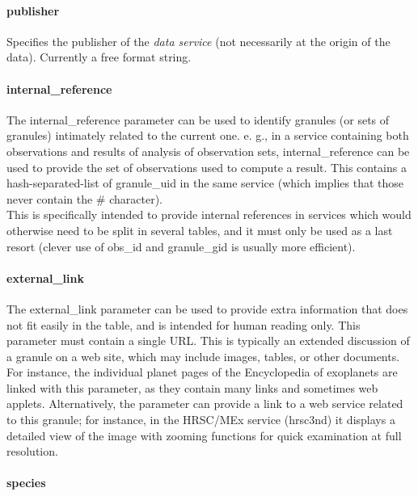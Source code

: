 \documentclass[11pt,a4paper]{ivoa}
\begin{document}
\paragraph{publisher}

Specifies the publisher of the \emph{data service} (not necessarily at the origin of the data). Currently a free format string.\\

\paragraph{internal\_reference}

The internal\_reference parameter can be used to identify granules (or sets of granules) intimately related to the current one. e. g., in a service containing both observations and results of analysis of observation sets, internal\_reference can be used to provide the set of observations used to compute a result. This contains a hash-separated-list of granule\_uid in the same service (which implies that those never contain the \# character).\\This is specifically intended to provide internal references in services which would otherwise need to be split in several tables, and it must only be used as a last resort (clever use of obs\_id and granule\_gid is usually more efficient).

\paragraph{external\_link}

The external\_link parameter can be used to provide extra information that does not fit easily in the table, and is intended for human reading only. This parameter must contain a single URL. This is typically an extended discussion of a granule on a web site, which may include images, tables, or other documents. For instance, the individual planet pages of the Encyclopedia of exoplanets are linked with this parameter, as they contain many links and sometimes web applets. Alternatively, the parameter can provide a link to a web service related to this granule; for instance, in the HRSC/MEx service (hrsc3nd) it displays a detailed view of the image with zooming functions for quick examination at full resolution.\\

\paragraph{species}
\end{document}
